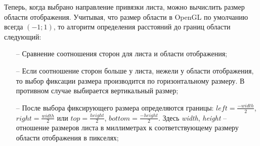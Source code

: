 \documentclass[a4paper, 12pt]{article}
\begin{document}
Теперь, когда выбрано направление привязки листа, можно вычислить размер области
отображения. Учитывая, что размер области в OpenGL по умолчанию всегда $(-1;1)$,
то алгоритм определения расстояний до границ области следующий:
\begin{itemize}
  \item[--] Сравнение соотношения сторон для листа и области отображения;
  \item[--] Если соотношение сторон больше у листа, нежели у области отображения,
    то выбор фиксации размера производится по горизонтальному размеру. В
    противном случае выбирается вертикальный размер;
  \item[--] После выбора фиксирующего размера определяются границы:
    $left = \frac{-width}{2}$, $right = \frac{width}{2}$ или
    $top = \frac{height}{2}$, $bottom = \frac{-height}{2}$. Здесь \textit{width},
    \textit{height} -- отношение размеров листа в миллиметрах к соответствующему
    размеру области отображения в пикселях;
    
\end{itemize}
\end{document}
